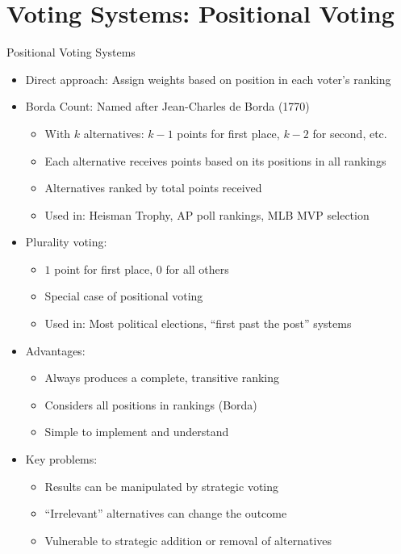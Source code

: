 \documentclass[10pt,handout]{beamer}
\begin{document}
\section{Voting Systems: Positional Voting}

\begin{frame}{Positional Voting Systems}
  \begin{itemize}[<+->]
    \item Direct approach: Assign weights based on position in each voter's ranking
    \item Borda Count: Named after Jean-Charles de Borda (1770)
      \begin{itemize}
        \item With $k$ alternatives: $k-1$ points for first place, $k-2$ for second, etc.
        \item Each alternative receives points based on its positions in all rankings
        \item Alternatives ranked by total points received
        \item Used in: Heisman Trophy, AP poll rankings, MLB MVP selection
      \end{itemize}
    \item Plurality voting:
      \begin{itemize}
        \item $1$ point for first place, $0$ for all others
        \item Special case of positional voting
        \item Used in: Most political elections, ``first past the post'' systems
      \end{itemize}
    \item Advantages:
      \begin{itemize}
        \item Always produces a complete, transitive ranking
        \item Considers all positions in rankings (Borda)
        \item Simple to implement and understand
      \end{itemize}
    \item Key problems:
      \begin{itemize}
        \item Results can be manipulated by strategic voting
        \item ``Irrelevant'' alternatives can change the outcome
        \item Vulnerable to strategic addition or removal of alternatives
      \end{itemize}
  \end{itemize}
\end{frame}
\end{document}
